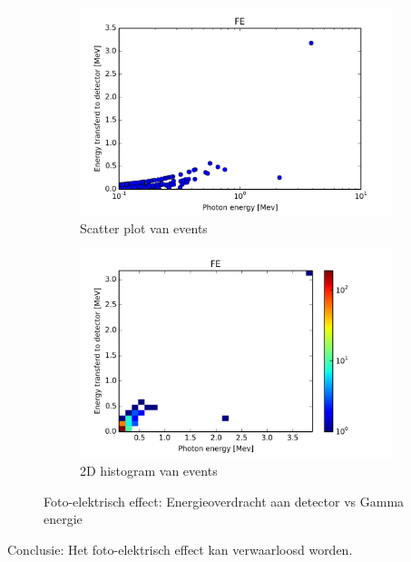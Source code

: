 \documentclass[a4paper,11pt]{article}
\begin{document}
\begin{figure}[h]
        \begin{subfigure}[b]{0.6\textwidth}
                \includegraphics[width=1\textwidth]{fig-fe-scatter.png}
                \caption{Scatter plot van events}
                \label{fig:fe-scatter}
        \end{subfigure}
        \begin{subfigure}[b]{0.6\textwidth}
                \includegraphics[width=1\textwidth]{fig-fe-hist2d.png}
                \caption{2D histogram van events}
                \label{fig:fe-hist3d}
        \end{subfigure}
        \caption{Foto-elektrisch effect: Energieoverdracht aan detector vs Gamma energie}\label{fig:fe}
\end{figure}


Conclusie: Het foto-elektrisch effect kan verwaarloosd worden.
\end{document}
